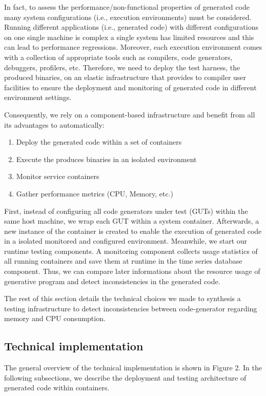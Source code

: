 In fact, to assess the performance/non-functional properties of generated code many system configurations (i.e., execution environments) must be considered. Running different applications (i.e., generated code) with different configurations on one single machine is complex  a single system has limited resources and this can lead to performance regressions. Moreover, each execution environment comes with a collection of appropriate tools such as compilers, code generators, debuggers, profilers, etc. Therefore, we need to deploy the test harness, \ie the produced binaries, on an elastic infrastructure that provides to compiler user facilities to ensure the deployment and monitoring of generated code in different environment settings. 

Consequently, we rely on a component-based infrastructure and benefit from all its advantages to automatically:
\begin{enumerate}
	\item Deploy the generated code within a set of containers
	\item Execute the produces binaries in an isolated environment 
	\item Monitor service containers
	\item Gather performance metrics (CPU, Memory, etc.)
\end{enumerate}

First, instead of configuring all code generators under test (GUTs) within the same host machine, we wrap each GUT within a system container. Afterwards, a new instance of the container is created to enable the execution of generated code in a isolated monitored and configured environment. Meanwhile, we start our runtime testing components. A monitoring component collects usage statistics of all running containers and save them at runtime in the time series database component. Thus, we can compare later informations about the resource usage of generative program and detect inconsistencies in the generated code.


The rest of this section details the technical choices we made to synthesis a testing infrastructure to detect inconsistencies between code-generator regarding memory and CPU consumption.  

\subsection{Technical implementation}

The general overview of the technical implementation is shown in Figure 2. In the following subsections, we describe the deployment and testing architecture of generated code within containers.


